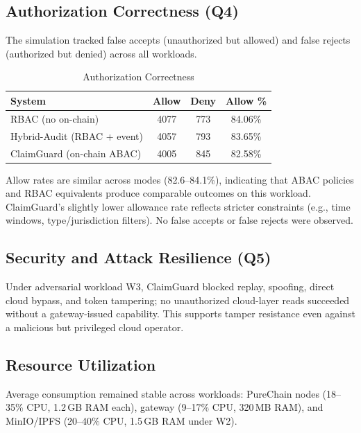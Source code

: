 \documentclass[final,5p,times,twocolumn]{elsarticle}
\begin{document}
\subsection{Authorization Correctness (Q4)}
The simulation tracked false accepts (unauthorized but allowed) and false
rejects (authorized but denied) across all workloads.
\begin{table}[!htbp]
	\centering
	\caption{Authorization Correctness}
	\begin{tabular}{lccc}
		\toprule
		\textbf{System}             & \textbf{Allow} & \textbf{Deny} & \textbf{Allow \%} \\
		\midrule
		RBAC (no on-chain)          & 4077           & 773           & 84.06\%           \\
		Hybrid-Audit (RBAC + event) & 4057           & 793           & 83.65\%           \\
		ClaimGuard (on-chain ABAC)  & 4005           & 845           & 82.58\%           \\
		\bottomrule
	\end{tabular}
	\label{tab:correctness}
\end{table}
Allow rates are similar across modes (82.6--84.1\%), indicating that ABAC policies and RBAC equivalents produce comparable outcomes on this workload. ClaimGuard's slightly lower allowance rate reflects stricter constraints (e.g., time windows, type/jurisdiction filters). No false accepts or false rejects were observed.

\subsection{Security and Attack Resilience (Q5)}

Under adversarial workload W3, ClaimGuard blocked replay, spoofing, direct cloud bypass, and token tampering; no unauthorized cloud-layer reads succeeded without a gateway-issued capability. This supports tamper resistance even against a malicious but privileged cloud operator.

\subsection{Resource Utilization}
Average consumption remained stable across workloads: PureChain nodes (18--35\% CPU, 1.2\,GB RAM each), gateway (9--17\% CPU, 320\,MB RAM), and MinIO/IPFS (20--40\% CPU, 1.5\,GB RAM under W2).
\end{document}
